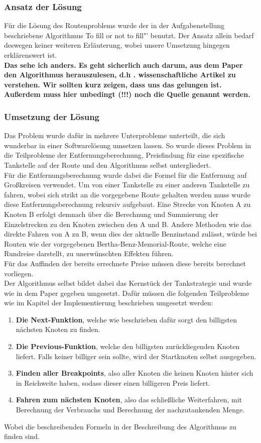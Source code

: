 \documentclass[11pt]{article}
\begin{document}
\subsubsection{Ansatz der Lösung}
	Für die Lösung des Routenproblems wurde der in der Aufgabenstellung beschriebene Algorithmus \glqq To fill or not to fill"' benutzt. Der Ansatz allein bedarf deswegen keiner weiteren Erläuterung, wobei unsere Umsetzung hingegen erklärenswert ist.\\
	\textbf{Das sehe ich anders. Es geht sicherlich auch darum, aus dem Paper den Algorithmus herauszulesen, d.h . wissenschaftliche Artikel zu verstehen. Wir sollten kurz zeigen, dass uns das gelungen ist. Außerdem muss hier unbedingt (!!!) noch die Quelle genannt werden.}
\subsubsection{Umsetzung der Lösung}
	Das Problem wurde dafür in mehrere Unterprobleme unterteilt, die sich wunderbar in einer Softwarelösung umsetzen lassen. So wurde dieses Problem in die Teilprobleme der Entfernungsberechnung, Preisfindung für eine spezifische Tankstelle auf der Route und den Algorithmus selbst untergliedert. \\
	Für die Entfernungsberechnung wurde dabei die Formel für die Entfernung auf Großkreisen verwendet. Um von einer Tankstelle zu einer anderen Tankstelle zu fahren, wobei sich strikt an die vorgegebene Route gehalten werden muss wurde diese Entfernungsberechnung rekursiv aufgebaut. Eine Strecke von Knoten A zu Knoten B erfolgt demnach über die Berechnung und Summierung der Einzelstrecken zu den Knoten zwischen den A und B. Andere Methoden wie das direkte Fahren von A zu B, wenn dies der aktuelle Benzinstand zulässt, würde bei Routen wie der vorgegebenen Bertha-Benz-Memorial-Route, welche eine Rundreise darstellt, zu unerwünschten Effekten führen. \\
	Für das Auffinden der bereits errechnete Preise müssen diese bereits berechnet vorliegen. \\
	Der Algorithmus selbst bildet dabei das Kernstück der Tankstrategie und wurde wie in dem Paper gegeben umgesetzt. Dafür müssen die folgenden Teilprobleme wie im Kapitel der Implementierung beschrieben umgesetzt werden:
	\begin{enumerate}
		\item \textbf{Die Next-Funktion}, welche wie beschrieben dafür sorgt den billigsten nächsten Knoten zu finden.
		\item \textbf{Die Previous-Funktion}, welche den billigsten zurückliegenden Knoten liefert. Falls keiner billiger sein sollte, wird der Startknoten selbst ausgegeben.
		\item \textbf{Finden aller Breakpoints}, also aller Knoten die keinen Knoten hinter sich in Reichweite haben, sodass dieser einen billigeren Preis liefert.
		\item \textbf{Fahren zum nächsten Knoten}, also das schließliche Weiterfahren, mit Berechnung der Verbrauchs und Berechnung der nachzutankenden Menge.
	\end{enumerate}
	Wobei die beschreibenden Formeln in der Beschreibung des Algorithmus zu finden sind.
\end{document}
